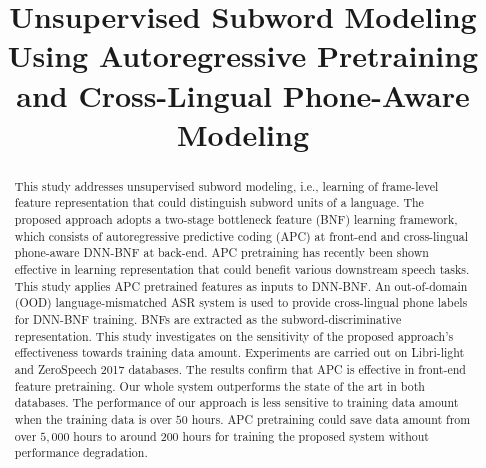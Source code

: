 \documentclass[a4paper]{article}
\title{Unsupervised Subword Modeling Using Autoregressive Pretraining and Cross-Lingual Phone-Aware Modeling}
\begin{document}
\maketitle
% 
\begin{abstract}
This study addresses unsupervised subword modeling, i.e., learning of frame-level feature representation that could distinguish subword units of a language. 
The proposed approach adopts a two-stage bottleneck feature (BNF) learning framework, which consists of 
autoregressive predictive coding (APC) at front-end  and cross-lingual phone-aware DNN-BNF at back-end. APC pretraining has recently been shown effective in learning representation that 
{\color{blue} could benefit}
various downstream speech tasks. This study applies APC pretrained features as inputs to DNN-BNF. An out-of-domain (OOD) language-mismatched  ASR system is used to provide cross-lingual phone labels for DNN-BNF training. BNFs are extracted as the subword-discriminative  representation. This study investigates on the sensitivity of the proposed approach's effectiveness towards training data amount. Experiments are carried out on Libri-light and ZeroSpeech 2017 databases. The results confirm that  APC  is effective in front-end feature pretraining.
Our whole system outperforms the state of the art in both databases. 
The performance of our  approach   is less sensitive to training data amount when the training data is over $50$ hours.  
APC pretraining could save data amount from over $5,000$ hours to around $200$ hours for training the proposed system without performance degradation.  



\end{abstract}
\end{document}

